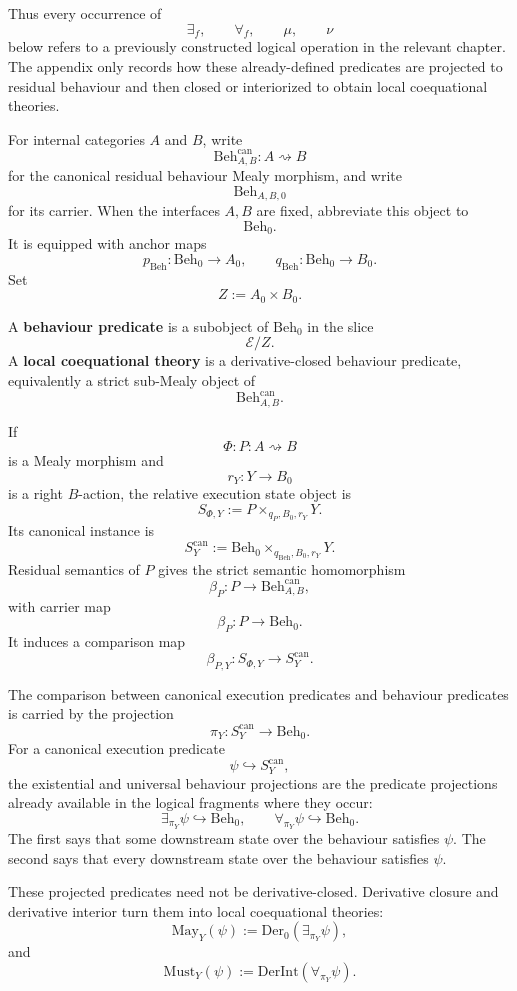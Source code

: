Thus every occurrence of
\[
  \exists_f,
  \qquad
  \forall_f,
  \qquad
  \mu,
  \qquad
  \nu
\]
below refers to a previously constructed logical operation in the relevant
chapter.  The appendix only records how these already-defined predicates are
projected to residual behaviour and then closed or interiorized to obtain
local coequational theories.

For internal categories \(A\) and \(B\), write
\[
  \mathrm{Beh}^{\mathrm{can}}_{A,B}:A\rightsquigarrow B
\]
for the canonical residual behaviour Mealy morphism, and write
\[
  \mathrm{Beh}_{A,B,0}
\]
for its carrier.  When the interfaces \(A,B\) are fixed, abbreviate this
object to
\[
  \mathrm{Beh}_0.
\]
It is equipped with anchor maps
\[
  p_{\mathrm{Beh}}:\mathrm{Beh}_0\to A_0,
  \qquad
  q_{\mathrm{Beh}}:\mathrm{Beh}_0\to B_0.
\]
Set
\[
  Z:=A_0\times B_0.
\]

A \textbf{behaviour predicate} is a subobject of
\(\mathrm{Beh}_0\) in the slice
\[
  \mathcal E/Z.
\]
A \textbf{local coequational theory} is a derivative-closed behaviour
predicate, equivalently a strict sub-Mealy object of
\[
  \mathrm{Beh}^{\mathrm{can}}_{A,B}.
\]

If
\[
  \Phi:P:A\rightsquigarrow B
\]
is a Mealy morphism and
\[
  r_Y:Y\to B_0
\]
is a right \(B\)-action, the relative execution state object is
\[
  S_{\Phi,Y}:=P\times_{q_P,B_0,r_Y}Y.
\]
Its canonical instance is
\[
  S^{\mathrm{can}}_Y
  :=
  \mathrm{Beh}_0\times_{q_{\mathrm{Beh}},B_0,r_Y}Y.
\]
Residual semantics of \(P\) gives the strict semantic homomorphism
\[
  \beta_P:P\to \mathrm{Beh}^{\mathrm{can}}_{A,B},
\]
with carrier map
\[
  \beta_P:P\to \mathrm{Beh}_0.
\]
It induces a comparison map
\[
  \beta_{P,Y}:S_{\Phi,Y}\longrightarrow S^{\mathrm{can}}_Y.
\]

The comparison between canonical execution predicates and behaviour
predicates is carried by the projection
\[
  \pi_Y:S^{\mathrm{can}}_Y\longrightarrow \mathrm{Beh}_0.
\]
For a canonical execution predicate
\[
  \psi\hookrightarrow S^{\mathrm{can}}_Y,
\]
the existential and universal behaviour projections are the predicate
projections already available in the logical fragments where they occur:
\[
  \exists_{\pi_Y}\psi\hookrightarrow \mathrm{Beh}_0,
  \qquad
  \forall_{\pi_Y}\psi\hookrightarrow \mathrm{Beh}_0.
\]
The first says that some downstream state over the behaviour satisfies
\(\psi\).  The second says that every downstream state over the behaviour
satisfies \(\psi\).

These projected predicates need not be derivative-closed.  Derivative closure
and derivative interior turn them into local coequational theories:
\[
  \mathrm{May}_Y(\psi)
  :=
  \mathrm{Der}_0(\exists_{\pi_Y}\psi),
\]
and
\[
  \mathrm{Must}_Y(\psi)
  :=
  \mathrm{DerInt}(\forall_{\pi_Y}\psi).
\]

